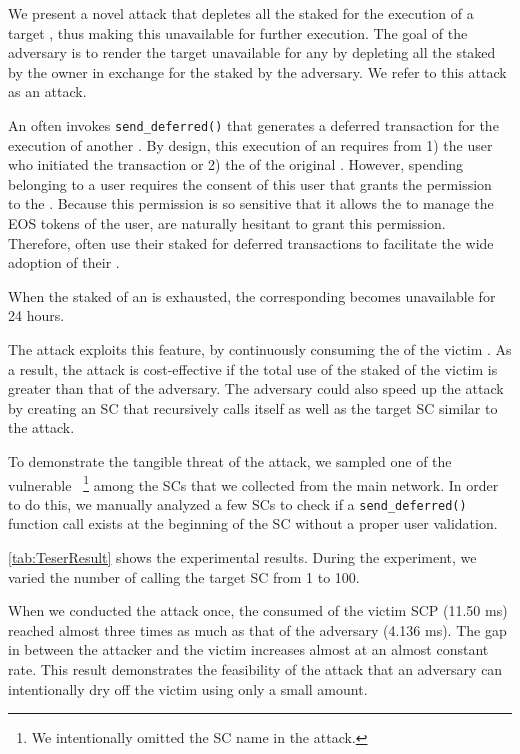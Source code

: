 

We present a novel attack that depletes all the \cpu staked for the execution of
a target \SC, thus making this \SC unavailable for further execution. The goal
of the adversary is to render the target \SC unavailable for any \BP by
depleting  all the \cpu staked by the \SC owner in exchange for the \cpu staked
by the adversary. We refer to this attack as an \textit{\TESER} attack.

An \SC often invokes \texttt{send\_deferred()} that generates a deferred
transaction for the execution of another \SC. By design, this execution of an
\SC requires \cpu from 1) the user who initiated the transaction or 2) the \SCP
of the original \SC.
%
However, spending \cpu belonging to a user requires the consent of this user
that grants the \code permission~\cite{EOSWHITEPAPER} to the \SC. Because this
permission is so sensitive that it allows the \SC to manage the EOS tokens of
the user, \users are naturally hesitant to grant this permission.
%
Therefore, \SCPs often use their staked \cpu for deferred transactions to
facilitate the wide adoption of their \SCs.

When the staked \cpu of an \SCP is exhausted, the corresponding \SC becomes
unavailable for 24 hours.

The \TESER attack exploits this feature, by continuously consuming the \cpu of
the victim \SCP. As a result, the attack is cost-effective if the total use of
the staked \cpu of the victim \SCP is greater than that of the adversary. The
adversary could also speed up the attack by creating an SC that recursively
calls itself as well as the target SC similar to the \NODEDOS attack.

To demonstrate the tangible threat of the \TESER attack, we sampled one of the
vulnerable \SCs~\footnote{We intentionally omitted the SC name in the \TESER
attack.} among the SCs that we collected from the main \eos network. In order
to do this, we manually analyzed a few SCs to check if a
\texttt{send\_deferred()} function call exists at the beginning of the SC
without a proper user validation.

\autoref{tab:TeserResult} shows the experimental results. During the experiment,
we varied the number of calling the target SC from 1 to 100.

When we conducted the attack once, the consumed \cpu of the victim SCP (11.50
ms) reached almost three times as much as that of the adversary (4.136 ms). The
gap in \cpu between the attacker and the victim \SCP increases almost at an
almost constant rate.
This result demonstrates the feasibility of the \TESER attack that an adversary
can intentionally dry off the victim using only a small \cpu amount.





